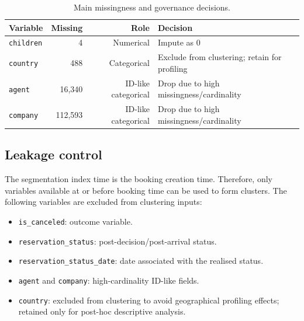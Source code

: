\documentclass[11pt,a4paper]{article}
\begin{document}
\begin{table}[H]
\centering
\caption{Main missingness and governance decisions.}
\begin{tabularx}{\textwidth}{lrrX}
\toprule
\textbf{Variable} & \textbf{Missing} & \textbf{Role} & \textbf{Decision} \\
\midrule
\texttt{children} & 4 & Numerical & Impute as 0 \\
\texttt{country} & 488 & Categorical & Exclude from clustering; retain for profiling \\
\texttt{agent} & 16,340 & ID-like categorical & Drop due to high missingness/cardinality \\
\texttt{company} & 112,593 & ID-like categorical & Drop due to high missingness/cardinality \\
\bottomrule
\end{tabularx}
\end{table}

\subsection{Leakage control}
The segmentation index time is the booking creation time. Therefore, only variables available at or before booking time can be used to form clusters. The following variables are excluded from clustering inputs:
\begin{itemize}
    \item \texttt{is\_canceled}: outcome variable.
    \item \texttt{reservation\_status}: post-decision/post-arrival status.
    \item \texttt{reservation\_status\_date}: date associated with the realised status.
    \item \texttt{agent} and \texttt{company}: high-cardinality ID-like fields.
    \item \texttt{country}: excluded from clustering to avoid geographical profiling effects; retained only for post-hoc descriptive analysis.
\end{itemize}
\end{document}
